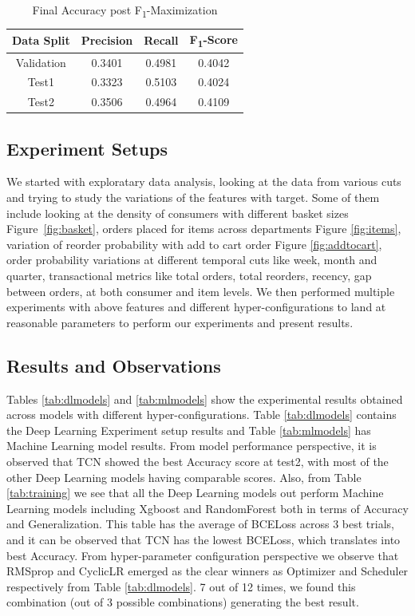 \begin{table}[t]
\caption{Final Accuracy post F\textsubscript{1}-Maximization}
\vspace{0.1 in}
\centering
\resizebox{3.3in}{!}
{%
\begin{tabular}{|c|c|c|c|}
\hline
{\bf Data Split} & {\bf Precision} & {\bf Recall} & {\bf F\textsubscript{1}-Score} \\ 
\hline\hline 
Validation	  	 &  0.3401 &  0.4981 &  0.4042  \\ \hline
Test1	  		 &  0.3323 &  0.5103 &  0.4024  \\ \hline
Test2	  		 & 0.3506 &  0.4964 &  0.4109 \\ \hline
\end{tabular}
}
\label{tab:Fscore}
\end{table}

\subsection{Experiment Setups}
We started with exploratary data analysis, looking at the data from various cuts and 
trying to study the variations of the features with target. Some of them include looking at the 
density of consumers with different basket sizes Figure~\ref{fig:basket}, orders placed for items 
across departments Figure \ref{fig:items}, variation of reorder probability with add to cart order Figure \ref{fig:addtocart},
order probability variations at different temporal cuts like week, month and quarter, transactional metrics 
like total orders, total reorders, recency, gap between orders, at both consumer and item levels.
We then performed multiple experiments with above features and different hyper-configurations to land at reasonable 
parameters to perform our experiments and present results.

\subsection{Results and Observations}
Tables \ref{tab:dlmodels} and \ref{tab:mlmodels} show the experimental results obtained across models with different 
hyper-configurations. Table \ref{tab:dlmodels} contains the Deep Learning Experiment setup results
and Table \ref{tab:mlmodels} has Machine Learning model results. From model performance perspective, it is observed that 
TCN showed the best Accuracy score at test2, with most of the other Deep Learning models having comparable scores.
Also, from Table \ref{tab:training} we see that all the Deep Learning models out perform Machine Learning models 
including Xgboost and RandomForest both in terms of Accuracy and Generalization. This table has the average of 
BCELoss across 3 best trials, and it can be observed that TCN has the lowest BCELoss, which translates into
best Accuracy. From hyper-parameter configuration perspective we observe that RMSprop and CyclicLR emerged as the 
clear winners as Optimizer and Scheduler respectively from Table \ref{tab:dlmodels}. 7 out of 12 times, we 
found this combination (out of 3 possible combinations) generating the best result.

